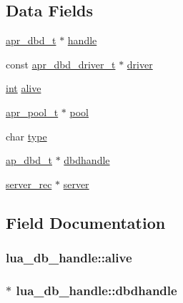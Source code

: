\subsection*{Data Fields}
\begin{DoxyCompactItemize}
\item 
\hyperlink{group__APR__Util__DBD_ga4738c1f6340184987fc7806522c18ab8}{apr\+\_\+dbd\+\_\+t} $\ast$ \hyperlink{structlua__db__handle_a947c85f9e009b088d612137192fd81c6}{handle}
\item 
const \hyperlink{structapr__dbd__driver__t}{apr\+\_\+dbd\+\_\+driver\+\_\+t} $\ast$ \hyperlink{structlua__db__handle_a41a6a7301da29e09088888b8922d4edc}{driver}
\item 
\hyperlink{pcre_8txt_a42dfa4ff673c82d8efe7144098fbc198}{int} \hyperlink{structlua__db__handle_acbd7286b520f2cc264aee3346d611533}{alive}
\item 
\hyperlink{structapr__pool__t}{apr\+\_\+pool\+\_\+t} $\ast$ \hyperlink{structlua__db__handle_a38b83f2e0af4f078f138f71d2f61001f}{pool}
\item 
char \hyperlink{structlua__db__handle_ac281c2727713e84a8632568f6112cd02}{type}
\item 
\hyperlink{structap__dbd__t}{ap\+\_\+dbd\+\_\+t} $\ast$ \hyperlink{structlua__db__handle_a67c707584b3125e5771b5b1aaad0b2e5}{dbdhandle}
\item 
\hyperlink{structserver__rec}{server\+\_\+rec} $\ast$ \hyperlink{structlua__db__handle_a2ecfc8b18f0f4f5dbb37c42bc1d505fd}{server}
\end{DoxyCompactItemize}


\subsection{Field Documentation}
\subsubsection[{\texorpdfstring{alive}{alive}}]{ lua\+\_\+db\+\_\+handle\+::alive}\hypertarget{structlua__db__handle_acbd7286b520f2cc264aee3346d611533}{}\label{structlua__db__handle_acbd7286b520f2cc264aee3346d611533}
\subsubsection[{\texorpdfstring{dbdhandle}{dbdhandle}}]{$\ast$ lua\+\_\+db\+\_\+handle\+::dbdhandle}\hypertarget{structlua__db__handle_a67c707584b3125e5771b5b1aaad0b2e5}{}\label{structlua__db__handle_a67c707584b3125e5771b5b1aaad0b2e5}
